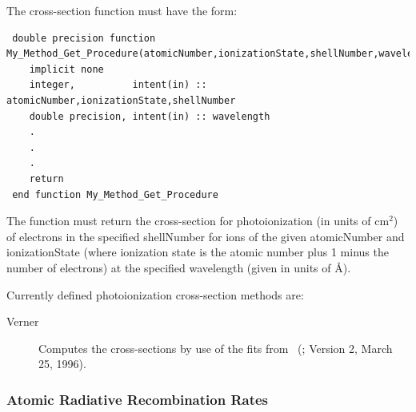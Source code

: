 The cross-section function must have the form:
\begin{verbatim}
 double precision function My_Method_Get_Procedure(atomicNumber,ionizationState,shellNumber,wavelength)
    implicit none
    integer,          intent(in) :: atomicNumber,ionizationState,shellNumber
    double precision, intent(in) :: wavelength
    .
    .
    .
    return
 end function My_Method_Get_Procedure
\end{verbatim}
The function must return the cross-section for photoionization (in units of cm$^2$) of electrons in the specified {\normalfont \ttfamily shellNumber} for ions of the given {\normalfont \ttfamily atomicNumber} and {\normalfont \ttfamily ionizationState} (where ionization state is the atomic number plus 1 minus the number of electrons) at the specified {\normalfont \ttfamily wavelength} (given in units of \AA).

Currently defined photoionization cross-section methods are:
\begin{description}
 \item [{\normalfont \ttfamily Verner}]  Computes the cross-sections by use of the fits from \citeauthor{verner_atomic_1996_1}~(\citeyear{verner_atomic_1996_1}; Version 2, March 25, 1996).
\end{description}

\subsubsection{Atomic Radiative Recombination Rates}

